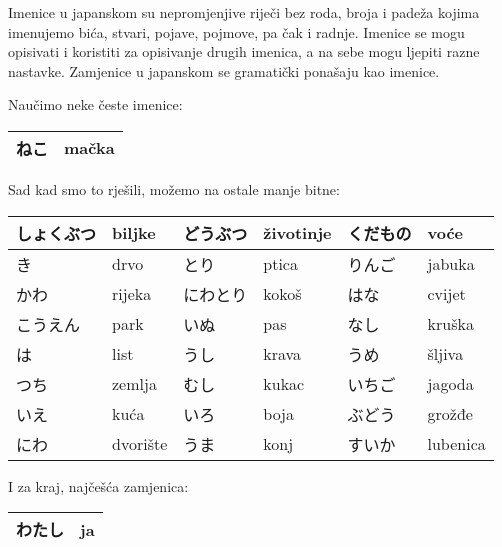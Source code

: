 
\author{Tomislav Mamić, Željka Ludošan}


	
	
	Imenice u japanskom su nepromjenjive riječi bez roda, broja i padeža kojima imenujemo bića, stvari, pojave, pojmove, pa čak i radnje. Imenice se mogu opisivati i koristiti za opisivanje drugih imenica, a na sebe mogu ljepiti razne nastavke. Zamjenice u japanskom se gramatički ponašaju kao imenice.

Naučimo neke česte imenice:
\vspace{10pt}

	\begin{tabular}{|l|l|}
		\hline
		ねこ&mačka\\\hline
	\end{tabular}
	\vspace{10pt}
	
	Sad kad smo to rješili, možemo na ostale manje bitne:
	
	\vspace{10pt}
	\begin{tabular}{|l|l|l|l|l|l|}
		\hline
		しょくぶつ&biljke&どうぶつ&životinje&くだもの&voće\\\hline
		き&drvo&とり&ptica&りんご&jabuka\\\hline
		かわ&rijeka&にわとり&kokoš&はな&cvijet\\\hline
		こうえん&park&いぬ&pas&なし&kruška\\\hline
		は&list&うし&krava&うめ&šljiva\\\hline
		つち&zemlja&むし&kukac&いちご&jagoda\\\hline
		いえ&kuća&いろ&boja&ぶどう&grožđe\\\hline
		にわ&dvorište&うま&konj&すいか&lubenica\\\hline
	\end{tabular}

	
	\vspace{10pt}
	I za kraj, najčešća zamjenica:
	
	\vspace{10pt}
	\begin{tabular}{|l|l|}
		\hline
		わたし&ja\\\hline
	\end{tabular}
	\vspace{10pt}

